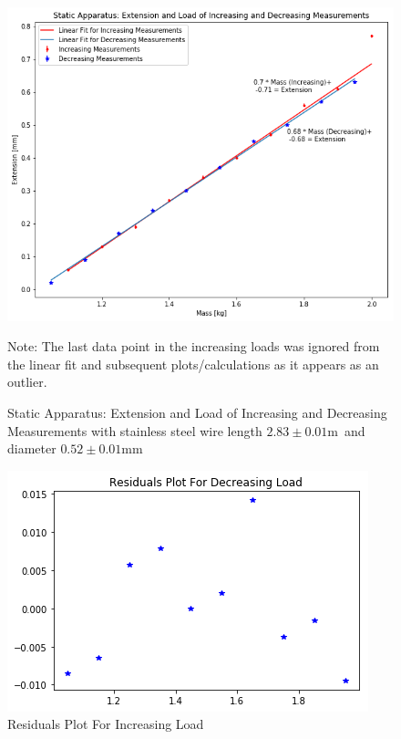 \documentclass[]{article}
\newcommand{\staticWireDiameter}{\ensuremath{0.52 \pm 0.01 \si{\milli\meter}}}
\newcommand{\staticWireLength}{\ensuremath{2.83 \pm 0.01 \si{\meter}}}
\begin{document}
\newpage
\begin{figure}[H]
    \includegraphics[width=\textwidth]{../output/staticgraph.png}
    \caption{Static Apparatus: Extension and Load of Increasing and Decreasing
    Measurements with stainless steel wire length \staticWireLength~and diameter
    \staticWireDiameter}\label{fig:static}
    Note: The last data point in the increasing loads was ignored from the
    linear fit and subsequent plots/calculations as it appears as an outlier.
\end{figure}

\begin{figure}[H]
    \includegraphics[width=\textwidth]{../output/residualsdecrease.png}
    \caption{Residuals Plot For Increasing Load}\label{fig:decreaseresidual}
\end{figure}
\end{document}
